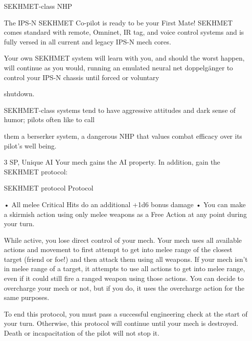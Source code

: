 SEKHMET-class NHP

The IPS-N SEKHMET Co-pilot is ready to be your First Mate! SEKHMET comes standard with remote,
Omninet, IR tag, and voice control systems and is fully versed in all current and legacy IPS-N mech cores.

Your own SEKHMET system will learn with you, and should the worst happen, will continue as you would,
running an emulated neural net doppelgänger to control your IPS-N chassis until forced or voluntary

shutdown.

SEKHMET-class systems tend to have aggressive attitudes and dark sense of humor; pilots often like to call

them a berserker system, a dangerous NHP that values combat efficacy over its pilot’s well being.

3 SP, Unique
AI
Your mech gains the AI property. In addition, gain the SEKHMET protocol:


SEKHMET protocol
Protocol

        • All melee Critical Hits do an additional +1d6 bonus damage
        •  You can make a skirmish action using only melee weapons as a Free Action at any point
          during your turn.





While active, you lose direct control of your mech. Your mech uses all available actions and
movement to first attempt to get into melee range of the closest target (friend or foe!) and then
attack them using all weapons. If your mech isn’t in melee range of a target, it attempts to use all
actions to get into melee range, even if it could still fire a ranged weapon using those actions.
You can decide to overcharge your mech or not, but if you do, it uses the overcharge action for
the same purposes.


To end this protocol, you must pass a successful engineering check at the start of your turn.
Otherwise, this protocol will continue until your mech is destroyed. Death or incapacitation of the
pilot will not stop it.
